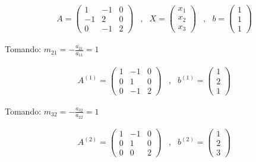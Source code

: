 \begin{equation*}
    \begin{matrix}
        A=\begin{pmatrix}
            1 & -1 & 0 \\
            -1 & 2 & 0 \\
            0 & -1 & 2
        \end{pmatrix}
        & , &
        X=\begin{pmatrix}
            x_1 \\
            x_2 \\
            x_3
        \end{pmatrix} 
        & , &
        b=\begin{pmatrix}
            1 \\
            1 \\
            1
        \end{pmatrix}
    \end{matrix}
\end{equation*}


Tomando: $m_{21}=-\frac{a_{21}}{a_{11}}=1$

\begin{equation*}
    \begin{matrix}
        A^{(1)}= \begin{pmatrix}
            1 & -1 & 0 \\
            0 & 1 & 0 \\
            0 & -1 & 2
        \end{pmatrix}
        & , &
        b^{(1)}=\begin{pmatrix}
            1 \\
            2 \\
            1
        \end{pmatrix}
    \end{matrix}
\end{equation*}

Tomando: $m_{32}=-\frac{a_{32}}{a_{22}}=1$

\begin{equation*}
    \begin{matrix}
        A^{(2)}= \begin{pmatrix}
            1 & -1 & 0 \\
            0 & 1 & 0 \\
            0 & 0 & 2
        \end{pmatrix}
        & , &
        b^{(2)}=\begin{pmatrix}
            1 \\
            2 \\
            3
        \end{pmatrix}
    \end{matrix}
\end{equation*}


